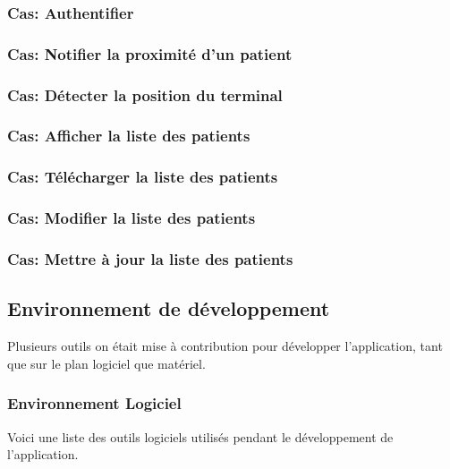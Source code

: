 \subsubsection{Cas: Authentifier}
\subsubsection{Cas: Notifier la proximité d'un patient}
\subsubsection{Cas: Détecter la position du terminal}
\subsubsection{Cas: Afficher la liste des patients}
\subsubsection{Cas: Télécharger la liste des patients}
\subsubsection{Cas: Modifier la liste des patients}
\subsubsection{Cas: Mettre à jour la liste des patients}

\subsection{Environnement de développement}%
Plusieurs outils on était mise à contribution pour développer l'application, tant que sur le plan logiciel que matériel.

\subsubsection{Environnement Logiciel}
Voici une liste des outils logiciels utilisés pendant le développement de l'application.

